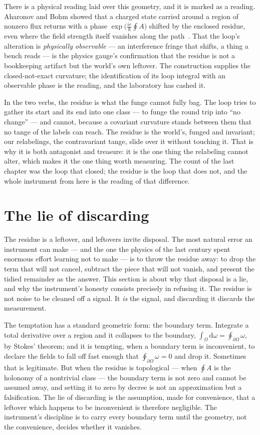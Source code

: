 There is a physical reading laid over this geometry, and it is marked as a reading. Aharonov and Bohm showed that a charged
state carried around a region of nonzero flux returns with a phase $\exp\!\big(\tfrac{ie}{\hbar}\oint A\big)$ shifted by the
enclosed residue, even where the field strength itself vanishes along the path~\cite{aharonov1959}. That the loop's
alteration is \emph{physically observable} --- an interference fringe that shifts, a thing a bench reads --- is the physics
gauge's confirmation that the residue is not a bookkeeping artifact but the world's own leftover. The construction supplies
the closed-not-exact curvature; the identification of its loop integral with an observable phase is the reading, and the
laboratory has cashed it.

In the two verbs, the residue is what the funge cannot fully bag. The loop tries to gather its start and its end into one
class --- to funge the round trip into ``no change'' --- and cannot, because a covariant curvature stands between them that no
tange of the labels can reach. The residue is the world's, funged and invariant; our relabelings, the contravariant tange,
slide over it without touching it. That is why it is both antagonist and treasure: it is the one thing the relabeling cannot
alter, which makes it the one thing worth measuring. The count of the last chapter was the loop that closed; the residue is
the loop that does not, and the whole instrument from here is the reading of that difference.

\section{The lie of discarding}

The residue is a leftover, and leftovers invite disposal. The most natural error an instrument can make --- and the one the
physics of the last century spent enormous effort learning not to make --- is to throw the residue away: to drop the term
that will not cancel, subtract the piece that will not vanish, and present the tidied remainder as the answer. This section
is about why that disposal is a lie, and why the instrument's honesty consists precisely in refusing it. The residue is not
noise to be cleaned off a signal. It \emph{is} the signal, and discarding it discards the measurement.

The temptation has a standard geometric form: the boundary term. Integrate a total derivative over a region and it collapses
to the boundary, $\int_\Omega \mathrm{d}\omega = \oint_{\partial\Omega} \omega$, by Stokes' theorem; and it is tempting, when
a boundary term is inconvenient, to declare the fields to fall off fast enough that $\oint_{\partial\Omega}\omega = 0$ and
drop it. Sometimes that is legitimate. But when the residue is topological --- when $\oint A$ is the holonomy of a
nontrivial class --- the boundary term is not zero and cannot be assumed away, and setting it to zero by decree is not an
approximation but a falsification. The lie of discarding is the assumption, made for convenience, that a leftover which
happens to be inconvenient is therefore negligible. The instrument's discipline is to carry every boundary term until the
geometry, not the convenience, decides whether it vanishes.

